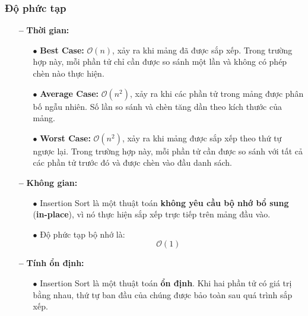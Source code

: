 \subsubsection{\textbf{Độ phức tạp}}
\begin{itemize}
    \item[\textbf{--}] \textbf{Thời gian:}
    \begin{itemize}
        \item[$\bullet$] \textbf{Best Case:} \(\mathcal{O}(n)\), xảy ra khi mảng đã được sắp xếp. Trong trường hợp này, mỗi phần tử chỉ cần được so sánh một lần và không có phép chèn nào thực hiện.
        \item[$\bullet$] \textbf{Average Case:} \(\mathcal{O}(n^2)\), xảy ra khi các phần tử trong mảng được phân bố ngẫu nhiên. Số lần so sánh và chèn tăng dần theo kích thước của mảng.
        \item[$\bullet$] \textbf{Worst Case:} \(\mathcal{O}(n^2)\), xảy ra khi mảng được sắp xếp theo thứ tự ngược lại. Trong trường hợp này, mỗi phần tử cần được so sánh với tất cả các phần tử trước đó và được chèn vào đầu danh sách.
    \end{itemize}
    \item[\textbf{--}] \textbf{Không gian:}
    \begin{itemize}
        \item[$\bullet$] Insertion Sort là một thuật toán \textbf{không yêu cầu bộ nhớ bổ sung} (\textbf{in-place}), vì nó thực hiện sắp xếp trực tiếp trên mảng đầu vào.
        \item[$\bullet$] Độ phức tạp bộ nhớ là:
        \[
        \mathcal{O}(1)
        \]
    \end{itemize}
    \item[\textbf{--}] \textbf{Tính ổn định:}
    \begin{itemize}
        \item[$\bullet$] Insertion Sort là một thuật toán \textbf{ổn định}. Khi hai phần tử có giá trị bằng nhau, thứ tự ban đầu của chúng được bảo toàn sau quá trình sắp xếp.
    \end{itemize}
\end{itemize}
